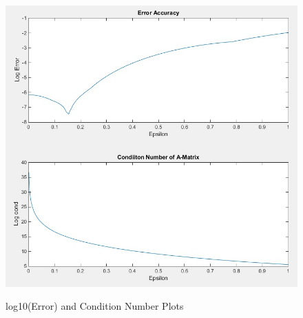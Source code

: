 \documentclass[11pt]{article}
\begin{document}
\begin{figure}[h!]
\centering
\includegraphics[scale=0.7]{vpaError.jpg}\\
\caption{log10(Error) and Condition Number Plots}
\label{fig:vpaError}
\end{figure}
\end{document}
